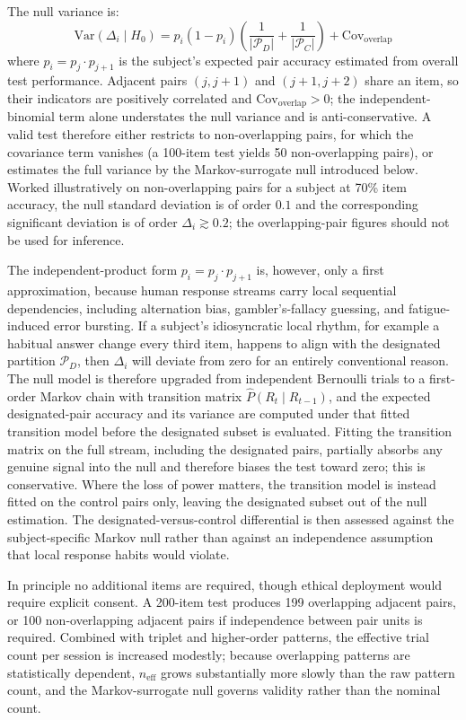 \documentclass[11pt,letterpaper]{article}
\begin{document}
The null variance is:
\begin{equation}
\text{Var}(\Delta_i \mid H_0) = p_i(1-p_i)\left(\frac{1}{|\mathcal{P}_D|} + \frac{1}{|\mathcal{P}_C|}\right) + \text{Cov}_{\text{overlap}}
\label{eq:pairnull}
\end{equation}
where $p_i = p_j \cdot p_{j+1}$ is the subject's expected pair accuracy estimated from overall test performance. Adjacent pairs $(j, j+1)$ and $(j+1, j+2)$ share an item, so their indicators are positively correlated and $\text{Cov}_{\text{overlap}} > 0$; the independent-binomial term alone understates the null variance and is anti-conservative. A valid test therefore either restricts to non-overlapping pairs, for which the covariance term vanishes (a 100-item test yields 50 non-overlapping pairs), or estimates the full variance by the Markov-surrogate null introduced below. Worked illustratively on non-overlapping pairs for a subject at 70\% item accuracy, the null standard deviation is of order $0.1$ and the corresponding significant deviation is of order $\Delta_i \gtrsim 0.2$; the overlapping-pair figures should not be used for inference.

The independent-product form $p_i = p_j \cdot p_{j+1}$ is, however, only a first approximation, because human response streams carry local sequential dependencies, including alternation bias, gambler's-fallacy guessing, and fatigue-induced error bursting. If a subject's idiosyncratic local rhythm, for example a habitual answer change every third item, happens to align with the designated partition $\mathcal{P}_D$, then $\Delta_i$ will deviate from zero for an entirely conventional reason. The null model is therefore upgraded from independent Bernoulli trials to a first-order Markov chain with transition matrix $\hat{P}(R_{t} \mid R_{t-1})$, and the expected designated-pair accuracy and its variance are computed under that fitted transition model before the designated subset is evaluated. Fitting the transition matrix on the full stream, including the designated pairs, partially absorbs any genuine signal into the null and therefore biases the test toward zero; this is conservative. Where the loss of power matters, the transition model is instead fitted on the control pairs only, leaving the designated subset out of the null estimation. The designated-versus-control differential is then assessed against the subject-specific Markov null rather than against an independence assumption that local response habits would violate.

In principle no additional items are required, though ethical deployment would require explicit consent. A 200-item test produces 199 overlapping adjacent pairs, or 100 non-overlapping adjacent pairs if independence between pair units is required. Combined with triplet and higher-order patterns, the effective trial count per session is increased modestly; because overlapping patterns are statistically dependent, $n_{\text{eff}}$ grows substantially more slowly than the raw pattern count, and the Markov-surrogate null governs validity rather than the nominal count.
\end{document}
